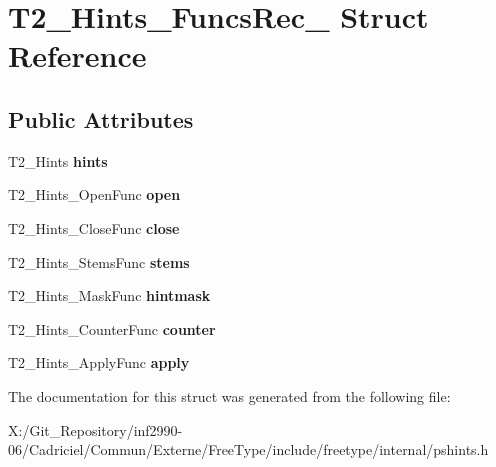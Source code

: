 \hypertarget{struct_t2___hints___funcs_rec__}{\section{T2\-\_\-\-Hints\-\_\-\-Funcs\-Rec\-\_\- Struct Reference}
\label{struct_t2___hints___funcs_rec__}
}
\subsection*{Public Attributes}
\begin{DoxyCompactItemize}
\item 
\hypertarget{struct_t2___hints___funcs_rec___af8daab694889bede5a513fbae5f86e25}{T2\-\_\-\-Hints {\bfseries hints}}\label{struct_t2___hints___funcs_rec___af8daab694889bede5a513fbae5f86e25}

\item 
\hypertarget{struct_t2___hints___funcs_rec___a1a5e0b296ee2e2ae6711b3ee35e5fcd9}{T2\-\_\-\-Hints\-\_\-\-Open\-Func {\bfseries open}}\label{struct_t2___hints___funcs_rec___a1a5e0b296ee2e2ae6711b3ee35e5fcd9}

\item 
\hypertarget{struct_t2___hints___funcs_rec___a7e50e26fd55254044bc9f2ba62574352}{T2\-\_\-\-Hints\-\_\-\-Close\-Func {\bfseries close}}\label{struct_t2___hints___funcs_rec___a7e50e26fd55254044bc9f2ba62574352}

\item 
\hypertarget{struct_t2___hints___funcs_rec___a12bfd8bae5d3df8f570fcdfb70c00139}{T2\-\_\-\-Hints\-\_\-\-Stems\-Func {\bfseries stems}}\label{struct_t2___hints___funcs_rec___a12bfd8bae5d3df8f570fcdfb70c00139}

\item 
\hypertarget{struct_t2___hints___funcs_rec___af50d0cadda7033d7dbd27a199ccfcdd4}{T2\-\_\-\-Hints\-\_\-\-Mask\-Func {\bfseries hintmask}}\label{struct_t2___hints___funcs_rec___af50d0cadda7033d7dbd27a199ccfcdd4}

\item 
\hypertarget{struct_t2___hints___funcs_rec___ad9d856a64b4a8556fc8d74bae1779e11}{T2\-\_\-\-Hints\-\_\-\-Counter\-Func {\bfseries counter}}\label{struct_t2___hints___funcs_rec___ad9d856a64b4a8556fc8d74bae1779e11}

\item 
\hypertarget{struct_t2___hints___funcs_rec___abaf12efb416bd79cf4ce72b13e6fc68f}{T2\-\_\-\-Hints\-\_\-\-Apply\-Func {\bfseries apply}}\label{struct_t2___hints___funcs_rec___abaf12efb416bd79cf4ce72b13e6fc68f}

\end{DoxyCompactItemize}


The documentation for this struct was generated from the following file\-:\begin{DoxyCompactItemize}
\item 
X\-:/\-Git\-\_\-\-Repository/inf2990-\/06/\-Cadriciel/\-Commun/\-Externe/\-Free\-Type/include/freetype/internal/pshints.\-h\end{DoxyCompactItemize}
